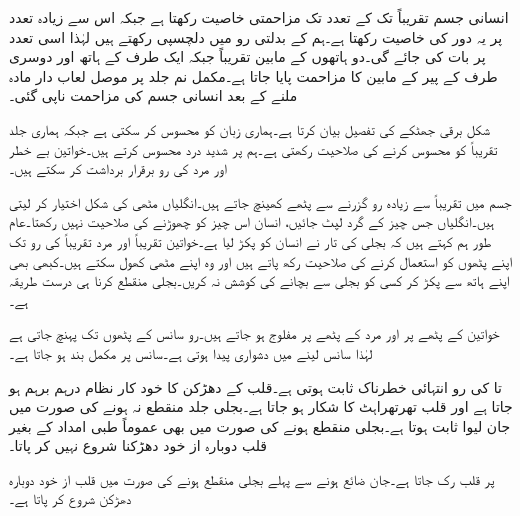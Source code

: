 انسانی جسم تقریباً  تک کے تعدد تک مزاحمتی خاصیت رکھتا ہے جبکہ اس سے زیادہ تعدد پر یہ  دور کی خاصیت رکھتا ہے۔ہم  کے بدلتی رو میں دلچسپی رکھتے ہیں لہٰذا اسی تعدد پر بات کی جائے گی۔دو ہاتھوں کے مابین تقریباً  جبکہ ایک طرف کے ہاتھ اور دوسری طرف کے پیر کے مابین  کا مزاحمت پایا جاتا ہے۔مکمل نم جلد پر موصل لعاب دار مادہ ملنے کے بعد انسانی جسم کی مزاحمت ناپی گئی۔  

شکل  برقی جھٹکے کی تفصیل بیان کرتا ہے۔ہماری زبان  کو محسوس کر سکتی ہے جبکہ ہماری جلد تقریباً  کو محسوس کرنے کی صلاحیت رکھتی ہے۔ہم  پر شدید درد محسوس کرتے ہیں۔خواتین بے خطر   اور مرد  کی رو برقرار برداشت کر سکتے ہیں۔

جسم میں تقریباً  سے زیادہ رو گزرنے سے پٹھے کھینچ جاتے ہیں۔انگلیاں مٹھی  کی شکل اختیار کر لیتی ہیں۔انگلیاں جس چیز کے گرد لپٹ جائیں، انسان اس چیز کو چھوڑنے کی صلاحیت نہیں رکھتا۔عام طور ہم کہتے ہیں کہ بجلی کی تار نے انسان کو پکڑ لیا ہے۔خواتین تقریباً  اور مرد تقریباً  کی رو تک اپنے پٹھوں کو استعمال کرنے کی صلاحیت رکھ پاتے ہیں اور وہ اپنے مٹھی کھول سکتے ہیں۔کبھی بھی اپنے  ہاتھ سے پکڑ کر کسی کو بجلی سے بچانے کی کوشش نہ کریں۔بجلی منقطع کرنا ہی درست طریقہ ہے۔

خواتین کے پٹھے  پر اور مرد کے پٹھے  پر مفلوج ہو جاتے ہیں۔رو سانس کے پٹھوں تک پہنچ جاتی ہے لہٰذا سانس لینے میں دشواری پیدا ہوتی ہے۔سانس  پر مکمل بند ہو جاتا ہے۔

 تا  کی رو انتہائی خطرناک ثابت ہوتی ہے۔قلب کے دھڑکن کا خود کار نظام درہم برہم ہو جاتا ہے اور قلب تھرتھراہٹ کا شکار ہو جاتا ہے۔بجلی جلد منقطع نہ ہونے کی صورت میں جان لیوا ثابت ہوتا ہے۔بجلی منقطع ہونے کی صورت میں بھی عموماً طبی امداد کے بغیر قلب دوبارہ از خود دھڑکنا شروع نہیں کر پاتا۔

 پر قلب رک جاتا ہے۔جان ضائع ہونے سے پہلے بجلی منقطع ہونے کی صورت میں قلب از خود دوبارہ دھڑکن شروع کر پاتا ہے۔

